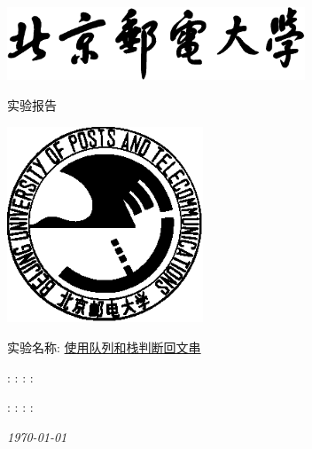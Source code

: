 \begin{titlepage}
    \center
    \includegraphics[width=3.5in]{images/buptname.eps}

    \begin{spacing}{5}
        {\bigsize 实验报告}
    \end{spacing}

    \includegraphics[width=2.3in]{images/buptseal.eps}

    \begin{spacing}{1}
        \vspace{2.5cm}
        \Large{实验名称:} \underline{使用队列和栈判断回文串}
        \vspace{3cm}
    \end{spacing}

    \begin{minipage}{\linewidth}
         : \underline{}
         : \underline{}
         : \underline{}
         : \underline{}
    \end{minipage}

    \begin{minipage}{\linewidth}
         : \underline{}
         : \underline{}
         : \underline{}
         : \underline{}
    \end{minipage}

    {\small\em \today }
\end{titlepage}

